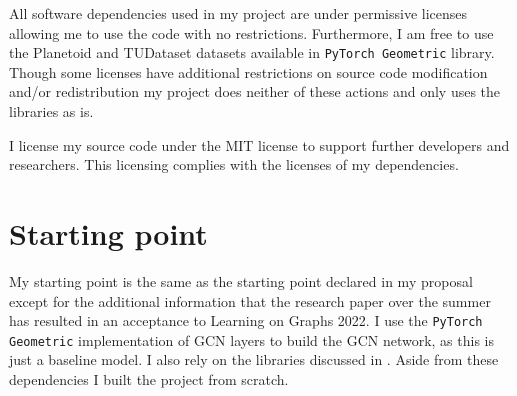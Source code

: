 All software dependencies used in my project are under permissive licenses allowing me to use the code with no restrictions.
Furthermore, I am free to use the Planetoid \cite{planetoid} and TUDataset \cite{Morris+2020} datasets available in \texttt{PyTorch Geometric}\cite{Fey/Lenssen/2019} library.
Though some licenses have additional restrictions on source code modification and/or redistribution my project does neither of these actions and only uses the libraries as is.

I license my source code under the MIT license to support further developers and researchers.
This licensing complies with the licenses of my dependencies.


\section{Starting point}

My starting point is the same as the starting point declared in my proposal except for the additional information that the research paper over the summer has resulted in an acceptance to Learning on Graphs 2022.
I use the \texttt{PyTorch Geometric}\cite{Fey/Lenssen/2019} implementation of GCN layers to build the GCN network, as this is just a baseline model. I also rely on the libraries discussed in .
Aside from these dependencies I built the project from scratch.

